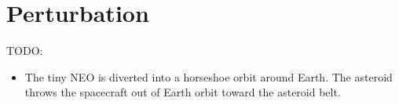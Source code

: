 %
%

\chapter{Perturbation}

TODO:

\begin{itemize}
\item The tiny NEO is diverted into a horseshoe orbit around Earth. The asteroid throws the spacecraft out of Earth orbit toward the asteroid belt.
\end{itemize}

\newpage
\thispagestyle{empty}